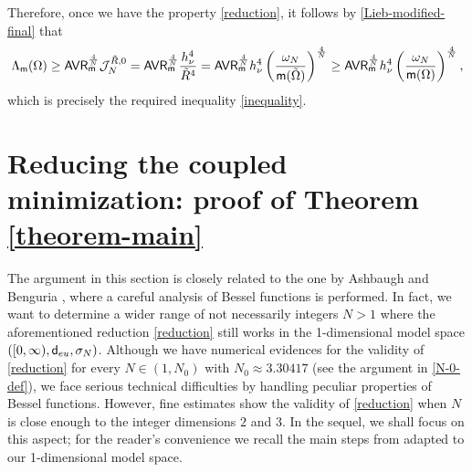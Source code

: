 \documentclass[11pt, reqno]{amsart}
\numberwithin{equation}{section}
\begin{document}
	Therefore, once we have the property \eqref{reduction}, it follows by \eqref{Lieb-modified-final} that 
		\begin{eqnarray}\label{estimate-last}
			\Lambda_{\sf m}(\Omega)\geq {\sf AVR}_ {\sf m}^\frac{4}{N}\mathcal J^{\tilde R,0}_N=
			{\sf AVR}_ {\sf m}^\frac{4}{N} \frac{h_\nu^4}{\tilde R^{4}}=
			{\sf AVR}_ {\sf m}^\frac{4}{N} h_\nu^4\left(\frac{\omega_N}{{\sf m}(\tilde \Omega)}\right)^\frac{4}{N}\geq {\sf AVR}_ {\sf m}^\frac{4}{N} h_\nu^4\left(\frac{\omega_N}{{\sf m}(\Omega)}\right)^\frac{4}{N},
		\end{eqnarray}
		which is precisely the required inequality \eqref{inequality}. 
		
		\section{Reducing the coupled minimization: proof of Theorem \ref{theorem-main}}
	
		
		
		The argument in this section is closely related to the one by Ashbaugh and Benguria \cite{A-B-Duke}, where a careful analysis of Bessel functions is performed. In fact, we want to determine a wider range of not necessarily integers $N>1$  where the aforementioned reduction \eqref{reduction} still works in the 1-dimensional model space $([0,\infty),{\sf d}_{\rm eu},\sigma_N)$. Although we have numerical evidences for the validity of \eqref{reduction} for every $N\in (1,N_0)$ with $N_0\approx 3.30417$ (see the argument in \eqref{N-0-def}), we face  serious technical difficulties by handling peculiar properties of Bessel functions. However, fine estimates show  the validity of \eqref{reduction} when $N$ is  close enough to the integer dimensions $2$ and $3$. In the sequel, we shall focus on this aspect;    for the reader's convenience   we recall the main steps  from \cite{A-B-Duke} adapted to our 1-dimensional model space. 
		
\end{document}
